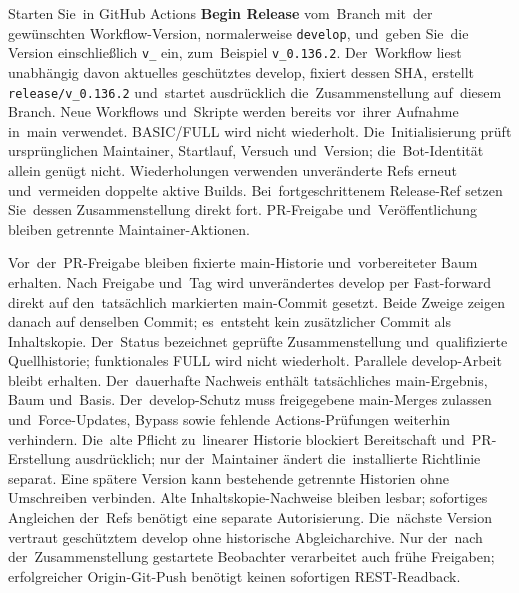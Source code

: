 \documentclass[11pt,a4paper]{article}
\newcommand{\ui}[1]{\textbf{#1}}
\newcommand{\codeword}[1]{\nolinkurl{#1}}
\begin{document}
Starten Sie~in GitHub Actions \ui{Begin Release} vom~Branch mit~der gewünschten
Workflow-Version, normalerweise \codeword{develop}, und~geben Sie~die Version
einschließlich \codeword{v_} ein, zum~Beispiel \codeword{v_0.136.2}.
Der~Workflow liest unabhängig davon aktuelles geschütztes develop, fixiert
dessen SHA, erstellt \codeword{release/v_0.136.2} und~startet ausdrücklich
die~Zusammenstellung auf~diesem Branch. Neue Workflows und~Skripte werden
bereits vor~ihrer Aufnahme in~main verwendet. BASIC/FULL wird nicht wiederholt.
Die~Initialisierung prüft ursprünglichen Maintainer, Startlauf, Versuch
und~Version;
die~Bot-Identität allein genügt nicht. Wiederholungen verwenden unveränderte
Refs erneut und~vermeiden doppelte aktive Builds. Bei~fortgeschrittenem
Release-Ref setzen Sie~dessen Zusammenstellung direkt fort. PR-Freigabe
und~Veröffentlichung bleiben getrennte Maintainer-Aktionen.

Vor~der~PR-Freigabe bleiben fixierte main-Historie und~vorbereiteter Baum
erhalten.
Nach Freigabe und~Tag wird unverändertes develop per Fast-forward direkt auf
den~tatsächlich markierten main-Commit gesetzt. Beide Zweige zeigen danach auf
denselben Commit; es~entsteht kein zusätzlicher Commit als Inhaltskopie.
Der~Status bezeichnet geprüfte Zusammenstellung und~qualifizierte Quellhistorie;
funktionales FULL wird nicht wiederholt. Parallele develop-Arbeit bleibt
erhalten.
Der~dauerhafte Nachweis enthält tatsächliches main-Ergebnis, Baum und~Basis.
Der~develop-Schutz muss freigegebene main-Merges zulassen und~Force-Updates,
Bypass sowie fehlende Actions-Prüfungen weiterhin verhindern. Die~alte Pflicht
zu~linearer Historie blockiert Bereitschaft und~PR-Erstellung ausdrücklich;
nur der~Maintainer ändert die~installierte Richtlinie separat. Eine spätere
Version kann bestehende getrennte Historien ohne Umschreiben verbinden.
Alte Inhaltskopie-Nachweise bleiben lesbar; sofortiges Angleichen der~Refs
benötigt eine separate Autorisierung.
Die~nächste Version vertraut geschütztem develop ohne historische
Abgleicharchive. Nur der~nach der~Zusammenstellung gestartete Beobachter
verarbeitet
auch frühe Freigaben; erfolgreicher Origin-Git-Push benötigt keinen sofortigen
REST-Readback.
\end{document}
